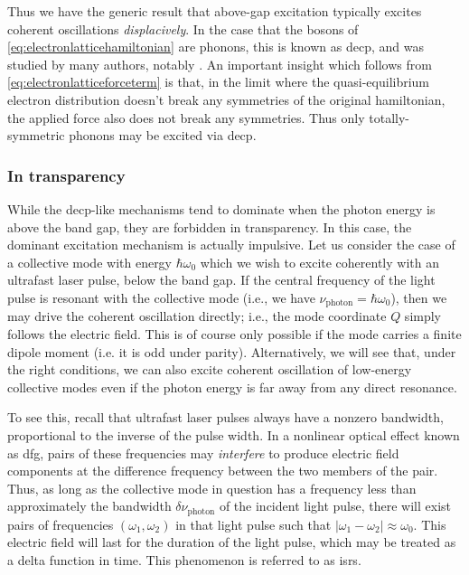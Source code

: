 Thus we have the generic result that above-gap excitation typically excites coherent oscillations \emph{displacively}.
In the case that the bosons of \cref{eq:electronlatticehamiltonian} are phonons, this is known as \gls{decp}, and was studied by many authors, notably \citet{zeiger_theory_1992}.
An important insight which follows from \cref{eq:electronlatticeforceterm} is that, in the limit where the quasi-equilibrium electron distribution doesn't break any symmetries of the original hamiltonian, the applied force also does not break any symmetries.
Thus only totally-symmetric phonons may be excited via \gls{decp}.

\subsubsection{In transparency}\label{sec:intransparency}

While the \gls{decp}-like mechanisms tend to dominate when the photon energy is above the band gap, they are forbidden in transparency.
In this case, the dominant excitation mechanism is actually impulsive.
Let us consider the case of a collective mode with energy $\hbar\omega_0$ which we wish to excite coherently with an ultrafast laser pulse, below the band gap.
If the central frequency of the light pulse is resonant with the collective mode (i.e., we have $\nu_\mathrm{photon}=\hbar\omega_0$), then we may drive the coherent oscillation directly; i.e., the mode coordinate $Q$ simply follows the electric field.
This is of course only possible if the mode carries a finite dipole moment (i.e. it is odd under parity).
Alternatively, we will see that, under the right conditions, we can also excite coherent oscillation of low-energy collective modes even if the photon energy is far away from any direct resonance.

To see this, recall that ultrafast laser pulses always have a nonzero bandwidth, proportional to the inverse of the pulse width.
In a nonlinear optical effect known as \gls{dfg}, pairs of these frequencies may \emph{interfere} to produce electric field components at the difference frequency between the two members of the pair.
Thus, as long as the collective mode in question has a frequency less than approximately the bandwidth $\delta \nu_\mathrm{photon}$ of the incident light pulse, there will exist pairs of frequencies $(\omega_1,\omega_2)$ in that light pulse such that $|\omega_1-\omega_2|\approx\omega_0$.
This electric field will last for the duration of the light pulse, which may be treated as a delta function in time.
This phenomenon is referred to as \gls{isrs}.

